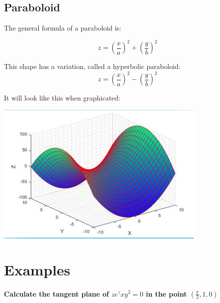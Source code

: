 \documentclass[11pt,fleqn]{book} %
\begin{document}
\subsection{Paraboloid}

The general formula of a paraboloid is:

\begin{equation}
    z = (\frac{x}{a})^2 + (\frac{y}{b})^2
\end{equation}

This shape has a variation, called a hyperbolic paraboloid:
\begin{equation}
    z = (\frac{x}{a})^2 - (\frac{y}{b})^2
\end{equation}

It will look like this when graphicated:
\begin{center}
    \includegraphics*[]{Pictures/hyperbolic_paraboloid.png}    
\end{center}

\section{Examples}

\paragraph{Calculate the tangent plane of $z e^z x y^2 = 0$ in the point $(\frac{\pi}{2},1,0)$}
\end{document}
